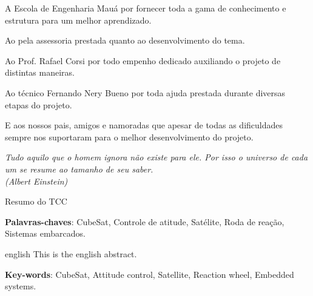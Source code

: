 \documentclass[
	12pt,				%
	openany,			%
	twoside,			%
	a4paper,			%
	english,			%
	french,				%
	spanish,			%
	brazil,				%
	oldfontcommands
	]{abntex2}
\begin{document}
\begin{agradecimentos}

A Escola de Engenharia Mauá por fornecer toda a gama de conhecimento e estrutura para um melhor aprendizado.\par

Ao {\imprimirorientador}  pela assessoria prestada quanto ao desenvolvimento do tema.\par

Ao Prof. Rafael Corsi por todo empenho dedicado auxiliando o projeto de distintas maneiras.\par

Ao técnico Fernando Nery Bueno por toda ajuda prestada durante diversas etapas do projeto.\par

E aos nossos pais, amigos e namoradas que apesar de todas as dificuldades sempre nos suportaram para o melhor desenvolvimento do projeto.

\end{agradecimentos}

\begin{epigrafe}
    \vspace*{\fill}
	\begin{flushright}
		\textit{Tudo aquilo que o homem ignora não existe para ele. Por isso o universo de cada um se resume ao tamanho de seu saber.\\(Albert Einstein)}
	\end{flushright}
\end{epigrafe}

\setlength{\absparsep}{18pt} %
\begin{resumo}
 Resumo do TCC

 \textbf{Palavras-chaves}: CubeSat, Controle de atitude, Satélite, Roda de reação, Sistemas embarcados.
\end{resumo}

\begin{resumo}[Abstract]
 \begin{otherlanguage*}{english}
   This is the english abstract.

   \vspace{\onelineskip}
 
   \noindent 
   \textbf{Key-words}: CubeSat, Attitude control, Satellite, Reaction wheel, Embedded systems.
 \end{otherlanguage*}
\end{resumo}
\end{document}
